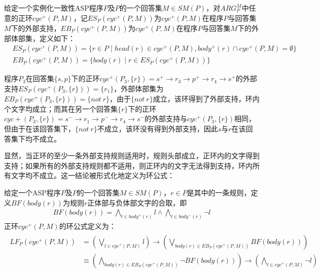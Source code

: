 \begin{definition}[正环的外部支持]
    给定一个实例化一致性ASP程序$P$及$P$的一个回答集$M \in SM(P)$，对$ARG^M_P$中任意的正环$cyc^+(P, M)$，记$ES_P(cyc^+(P, M))$为$cyc^+(P, M)$在程序$P$与回答集$M$下的外部支持，$EB_P(cyc^+(P, M))$为$cyc^+(P, M)$在程序$P$与回答集$M$下的外部体部集，定义如下：
    \begin{align}
        &\mathit{ES_P(cyc^+(P, M)) = \{ r \in P \mid head(r) \in cyc^+(P, M), body^+(r) \cap cyc^+(P, M) = \emptyset\}}\\
        &\mathit{EB_P(cyc^+(P, M)) = \{body(r) \mid r \in ES_P(cyc^+(P, M)) \}}
      \end{align}
\end{definition}
\begin{example}
    程序\hyperref[prg:p3]{$P_3$}在回答集$\{s, p\}$下的正环$cyc^+(P_3, \{r\})=s^+ \rightarrow r_3 \rightarrow p^+ \rightarrow r_4 \rightarrow s^+$的外部支持$ES_P(cyc^+(P_3, \{r\}))=\{r_1\}$，外部体部集为$EB_P(cyc^+(P_3, \{r\}))=\{not\ r\}$，由于$\{not\ r\}$成立，该环得到了外部支持，环内个文字均成立；而其在另一个回答集$\{r\}$下的正环$cyc+(P_3, \{r\})=s^- \rightarrow r_1 \rightarrow p^- \rightarrow r_4 \rightarrow s^-$的外部支持与$cyc^+(P_3, \{r\})$相同，但由于在该回答集下，$\{not\ r\}$不成立，该环没有得到外部支持，因此$s$与$r$在该回答集下均不成立。
\end{example}

显然，当正环的至少一条外部支持规则适用时，规则头部成立，正环内的文字得到支持；如果所有的外部支持规则都不适用，则正环内的文字无法得到支持，环内所有文字均不成立。这一结论被形式化地定义为环公式：

\begin{definition}[正环的环公式]
    给定一个ASP程序$P$及$P$的一个回答集$M \in SM(P)$，$r\in P$是其中的一条规则，定义$BF(body(r))$为规则$r$正体部与负体部文字的合取，即
    \begin{align}
        BF(body(r))=\bigwedge_{l \in body^+(r)} l \land \bigwedge_{l \in body^-(r)} \lnot l
      \end{align}
    正环$cyc^+(P, M)$的环公式定义为：
    \begin{align}
        \begin{split}
            \mathit{LF_P(cyc^+(P, M))} &\mathit{= \left( \bigvee_{l \in cyc^+(P, M)} l \right)  \rightarrow \left(\bigvee_{body(r)\in EB_P(cyc^+(P, M))}BF(body(r))\right)}\\ 
        &\mathit{\equiv  \left(\bigwedge_{body(r) \in EB_P(cyc^+(P, M))} \lnot BF(body(r)) \right) \rightarrow  \left( \bigwedge_{l \in cyc^+(P, M)} \lnot l \right)} \label{eq:loopformula}
        \end{split}
        \end{align}
\end{definition}

